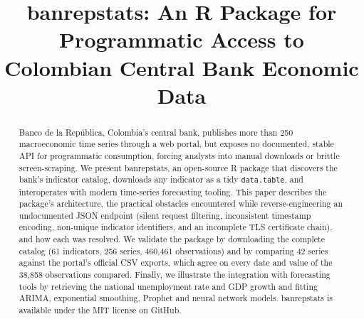 \documentclass[conference]{IEEEtran}
\begin{document}
\title{banrepstats: An R Package for Programmatic Access to Colombian Central Bank Economic Data}

\author{
  \and
  \and
}

\maketitle

\begin{abstract}
Banco de la Rep\'ublica, Colombia's central bank, publishes more than 250
macroeconomic time series through a web portal, but exposes no documented,
stable API for programmatic consumption, forcing analysts into manual
downloads or brittle screen-scraping. We present banrepstats, an
open-source R package that discovers the bank's indicator catalog,
downloads any indicator as a tidy \texttt{data.table}, and interoperates
with modern time-series forecasting tooling. This paper describes the
package's architecture, the practical obstacles encountered while
reverse-engineering an undocumented JSON endpoint (silent request
filtering, inconsistent timestamp encoding, non-unique indicator
identifiers, and an incomplete TLS certificate chain), and how each was
resolved. We validate the package by downloading the complete catalog
(61 indicators, 256 series, 460,461 observations) and by comparing 42
series against the portal's official CSV exports, which agree on every
date and value of the 38,858 observations compared. Finally, we
illustrate the integration with forecasting tools by retrieving the
national unemployment rate and GDP growth and fitting ARIMA, exponential
smoothing, Prophet and neural network models. banrepstats is available
under the MIT license on GitHub.
\end{abstract}
\end{document}
